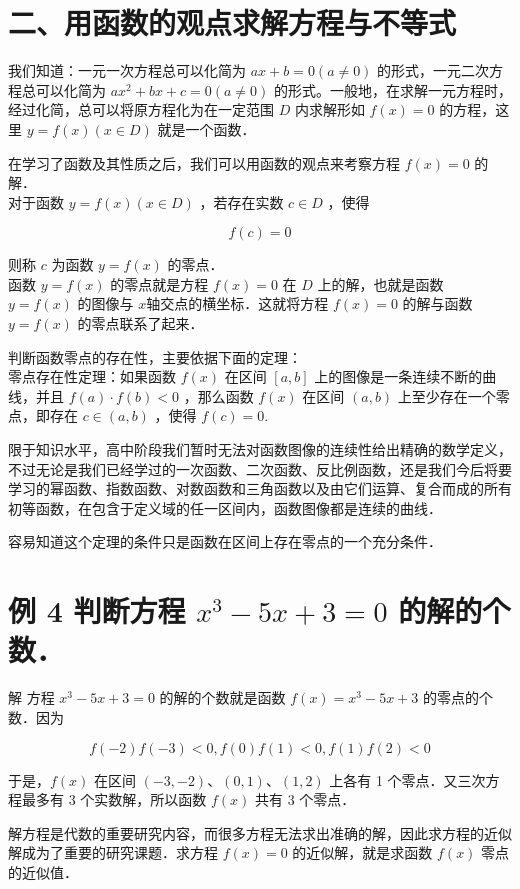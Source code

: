 \documentclass[10pt]{article}
\begin{document}
\section*{二、用函数的观点求解方程与不等式}
我们知道：一元一次方程总可以化简为 \(a x+b=0(a \neq 0)\) 的形式，一元二次方程总可以化简为 \(a x^{2}+b x+c=0(a \neq 0)\) 的形式。一般地，在求解一元方程时，经过化简，总可以将原方程化为在一定范围 \(D\) 内求解形如 \(f(x)=0\) 的方程，这里 \(y=f(x)(x \in D)\) 就是一个函数．

在学习了函数及其性质之后，我们可以用函数的观点来考察方程 \(f(x)=0\) 的解．\\
对于函数 \(y=f(x)(x \in D)\) ，若存在实数 \(c \in D\) ，使得

\[
f(c)=0
\]

则称 \(c\) 为函数 \(y=f(x)\) 的零点．\\
函数 \(y=f(x)\) 的零点就是方程 \(f(x)=0\) 在 \(D\) 上的解，也就是函数 \(y=f(x)\) 的图像与 \(x\)轴交点的横坐标．这就将方程 \(f(x)=0\) 的解与函数 \(y=f(x)\) 的零点联系了起来．

判断函数零点的存在性，主要依据下面的定理：\\
零点存在性定理：如果函数 \(f(x)\) 在区间 \([a, b]\) 上的图像是一条连续不断的曲线，并且 \(f(a) \cdot f(b)<0\) ，那么函数 \(f(x)\) 在区间 \((a, b)\) 上至少存在一个零点，即存在 \(c \in(a, b)\) ，使得 \(f(c)=0\).

限于知识水平，高中阶段我们暂时无法对函数图像的连续性给出精确的数学定义，不过无论是我们已经学过的一次函数、二次函数、反比例函数，还是我们今后将要学习的幂函数、指数函数、对数函数和三角函数以及由它们运算、复合而成的所有初等函数，在包含于定义域的任一区间内，函数图像都是连续的曲线．

容易知道这个定理的条件只是函数在区间上存在零点的一个充分条件．

\section*{例 4 判断方程 \(x^{3}-5 x+3=0\) 的解的个数．}
解 方程 \(x^{3}-5 x+3=0\) 的解的个数就是函数 \(f(x)=x^{3}-5 x+3\) 的零点的个数．因为

\[
f(-2) f(-3)<0, f(0) f(1)<0, f(1) f(2)<0
\]

于是，\(f(x)\) 在区间 \((-3,-2) 、(0,1) 、(1,2)\) 上各有 1 个零点．又三次方程最多有 3 个实数解，所以函数 \(f(x)\) 共有 3 个零点．

解方程是代数的重要研究内容，而很多方程无法求出准确的解，因此求方程的近似解成为了重要的研究课题．求方程 \(f(x)=0\) 的近似解，就是求函数 \(f(x)\) 零点的近似值．
\end{document}
